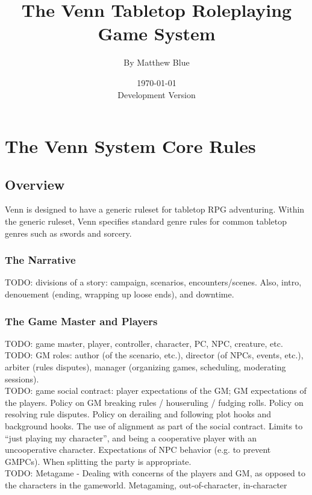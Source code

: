 \documentclass[letterpaper,titlepage,openany,twocolumn]{book}
\begin{document}
\frontmatter

\title{The Venn Tabletop Roleplaying Game System}
\date{\today\\Development Version}
\author{By Matthew Blue}
\maketitle

\setcounter{secnumdepth}{0}
\setcounter{tocdepth}{3}
\tableofcontents


\mainmatter

\part{The Venn System Core Rules}

\chapter{Overview}
Venn is designed to have a generic ruleset for tabletop RPG adventuring. Within the generic ruleset, Venn specifies standard genre rules for common tabletop genres such as swords and sorcery.

\section{The Narrative}
TODO: divisions of a story: campaign, scenarios, encounters/scenes. Also, intro, denouement (ending, wrapping up loose ends), and downtime.\\

\section{The Game Master and Players}
TODO: game master, player, controller, character, PC, NPC, creature, etc.\\
TODO: GM roles: author (of the scenario, etc.), director (of NPCs, events, etc.), arbiter (rules disputes), manager (organizing games, scheduling, moderating sessions).\\
TODO: game social contract: player expectations of the GM; GM expectations of the players. Policy on GM breaking rules / houseruling / fudging rolls. Policy on resolving rule disputes. Policy on derailing and following plot hooks and background hooks. The use of alignment as part of the social contract. Limits to “just playing my character”, and being a cooperative player with an uncooperative character. Expectations of NPC behavior (e.g. to prevent GMPCs). When splitting the party is appropriate.\\
TODO: Metagame - Dealing with concerns of the players and GM, as opposed to the characters in the gameworld. Metagaming, out-of-character, in-character\\
\end{document}

